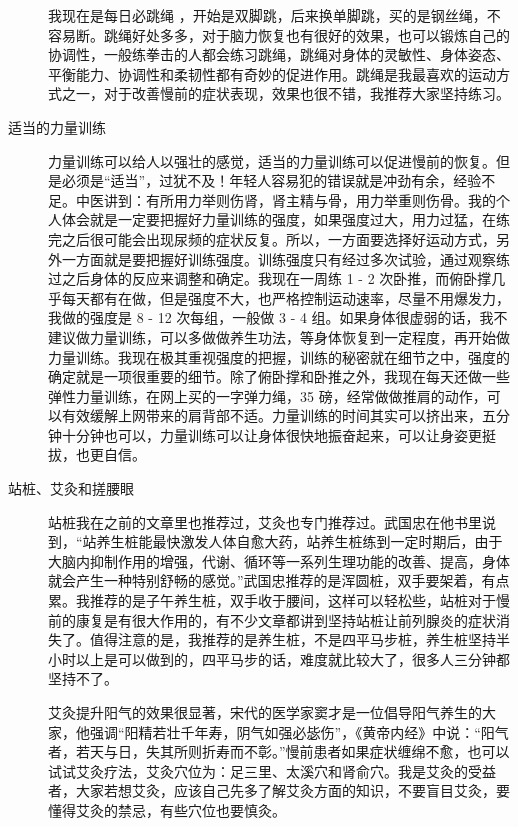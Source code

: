 \begin{description}
    我现在是每日必跳绳 ，开始是双脚跳，后来换单脚跳，买的是钢丝绳，不容易断。跳绳好处多多，对于脑力恢复也有很好的效果，也可以锻炼自己的协调性，一般练拳击的人都会练习跳绳，跳绳对身体的灵敏性、身体姿态、平衡能力、协调性和柔韧性都有奇妙的促进作用。跳绳是我最喜欢的运动方式之一，对于改善慢前的症状表现，效果也很不错，我推荐大家坚持练习。
    \item[适当的力量训练] 力量训练可以给人以强壮的感觉，适当的力量训练可以促进慢前的恢复。但是必须是“适当”，过犹不及！年轻人容易犯的错误就是冲劲有余，经验不足。中医讲到：有所用力举则伤肾，肾主精与骨，用力举重则伤骨。我的个人体会就是一定要把握好力量训练的强度，如果强度过大，用力过猛，在练完之后很可能会出现尿频的症状反复。所以，一方面要选择好运动方式，另外一方面就是要把握好训练强度。训练强度只有经过多次试验，通过观察练过之后身体的反应来调整和确定。我现在一周练 1 - 2 次卧推，而俯卧撑几乎每天都有在做，但是强度不大，也严格控制运动速率，尽量不用爆发力，我做的强度是 8 - 12 次每组，一般做 3 - 4 组。如果身体很虚弱的话，我不建议做力量训练，可以多做做养生功法，等身体恢复到一定程度，再开始做力量训练。我现在极其重视强度的把握，训练的秘密就在细节之中，强度的确定就是一项很重要的细节。除了俯卧撑和卧推之外，我现在每天还做一些弹性力量训练，在网上买的一字弹力绳，35 磅，经常做做推肩的动作，可以有效缓解上网带来的肩背部不适。力量训练的时间其实可以挤出来，五分钟十分钟也可以，力量训练可以让身体很快地振奋起来，可以让身姿更挺拔，也更自信。
    \item[站桩、艾灸和搓腰眼] 站桩我在之前的文章里也推荐过，艾灸也专门推荐过。武国忠在他书里说到，“站养生桩能最快激发人体自愈大药，站养生桩练到一定时期后，由于大脑内抑制作用的增强，代谢、循环等一系列生理功能的改善、提高，身体就会产生一种特别舒畅的感觉。”武国忠推荐的是浑圆桩，双手要架着，有点累。我推荐的是子午养生桩，双手收于腰间，这样可以轻松些，站桩对于慢前的康复是有很大作用的，有不少文章都讲到坚持站桩让前列腺炎的症状消失了。值得注意的是，我推荐的是养生桩，不是四平马步桩，养生桩坚持半小时以上是可以做到的，四平马步的话，难度就比较大了，很多人三分钟都坚持不了。

    艾灸提升阳气的效果很显著，宋代的医学家窦才是一位倡导阳气养生的大家，他强调“阳精若壮千年寿，阴气如强必毖伤”，《黄帝内经》中说：“阳气者，若天与日，失其所则折寿而不彰。”慢前患者如果症状缠绵不愈，也可以试试艾灸疗法，艾灸穴位为：足三里、太溪穴和肾俞穴。我是艾灸的受益者，大家若想艾灸，应该自己先多了解艾灸方面的知识，不要盲目艾灸，要懂得艾灸的禁忌，有些穴位也要慎灸。


\end{description}
